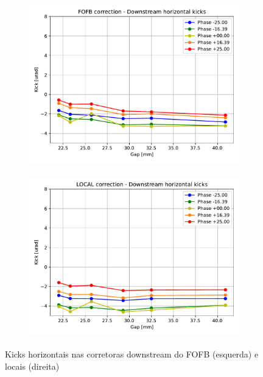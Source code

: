 \documentclass[a4paper,12pt]{article}
\begin{document}
\begin{figure}[H]
\begin{subfigure}{0.5\textwidth}
\includegraphics[width=0.9\linewidth, height=7cm]{figs/FOFB-down-kickx.pdf} 
\label{fig:subimfofbdown}
\end{subfigure}
\begin{subfigure}{0.5\textwidth}
\includegraphics[width=0.9\linewidth, height=7cm]{figs/LOCAL-down-kickx.pdf}
\label{fig:subimlocaldown}
\end{subfigure}
\caption{Kicks horizontais nas corretoras downstream do FOFB (esquerda) e locais (direita)}
\label{fig:downx}
\end{figure}
\end{document}

